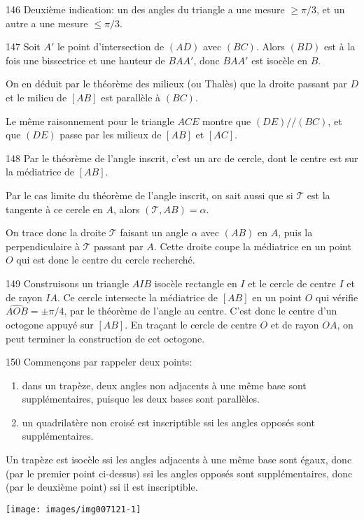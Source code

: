 \begin{Soln}{146}
Deuxième indication: un des angles du triangle a une mesure $\geq \pi/3$, et un autre a une mesure $\leq \pi/3$.
\end{Soln}
\begin{Soln}{147}
Soit $A'$ le point d'intersection de $(AD)$ avec $(BC)$. Alors $(BD)$ est à la fois une bissectrice et une hauteur de $BAA'$, donc $BAA'$ est isocèle en $B$.

On en déduit par le théorème des milieux (ou Thalès) que la droite passant par $D$ et le milieu de $[AB]$ est parallèle à $(BC)$.

Le même raisonnement pour le triangle $ACE$ montre que $(DE) // (BC)$, et que $(DE)$ passe par les milieux de $[AB]$ et $[AC]$.
\end{Soln}
\begin{Soln}{148}
Par le théorème de l'angle inscrit, c'est un arc de cercle, dont le centre est sur la médiatrice de $[AB]$.

Par le cas limite du théorème de l'angle inscrit, on sait aussi que si $\mathcal T$ est la tangente à ce cercle en $A$, alors $(\mathcal T,AB)=\alpha$.

On trace donc la droite $\mathcal T$ faisant un angle $\alpha$ avec $(AB)$ en $A$, puis la perpendiculaire à $\mathcal T$ passant par $A$. Cette droite coupe la médiatrice en un point $O$ qui est donc le centre du cercle recherché.
\end{Soln}
\begin{Soln}{149}
Construisons un triangle $AIB$ isocèle rectangle en $I$ et le cercle de centre $I$ et de rayon $IA$. Ce cercle intersecte la médiatrice de $[AB]$ en un point $O$ qui vérifie $\widehat{AOB}=\pm \pi/4$, par le théorème de l'angle au centre. C'est donc le centre d'un octogone appuyé sur $[AB]$. En traçant le cercle de centre $O$ et de rayon $OA$, on peut terminer la construction de cet octogone.
\end{Soln}
\begin{Soln}{150}
Commençons par rappeler deux points:
\begin{enumerate}
\item dans un trapèze, deux angles non adjacents à une même base sont supplémentaires, puisque les deux bases sont parallèles.
\item un quadrilatère non croisé est inscriptible ssi les angles opposés sont supplémentaires.
\end{enumerate}

Un trapèze est isocèle ssi les angles adjacents à une même base sont égaux, donc (par le premier point ci-dessus) ssi les angles opposés sont supplémentaires, donc (par le deuxième point) ssi il est inscriptible.

\begin{center}
\texttt{[image: images/img007121-1]}
\end{center}

\end{Soln}
